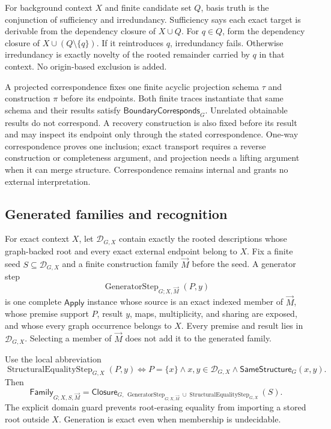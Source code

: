 \documentclass[11pt,twoside]{article}
\newcommand{\Apply}{\mathsf{Apply}}
\newcommand{\Closure}{\mathsf{Closure}}
\newcommand{\SameStructure}{\mathsf{SameStructure}}
\newcommand{\BoundaryCorresponds}{\mathsf{BoundaryCorresponds}}
\newcommand{\Family}{\mathsf{Family}}
\begin{document}
For background context \(X\) and finite candidate set \(Q\), basis truth is the
conjunction of sufficiency and irredundancy.  Sufficiency says each exact target is
derivable from the dependency closure of \(X\cup Q\).  For \(q\in Q\), form the
dependency closure of \(X\cup(Q\setminus\{q\})\).  If it reintroduces \(q\),
irredundancy fails.  Otherwise irredundancy is exactly novelty of the rooted
remainder carried by \(q\) in that context.  No origin-based exclusion is added.

A projected correspondence fixes one finite acyclic projection schema \(\tau\)
and construction \(\pi\) before its endpoints.  Both finite traces instantiate
that same schema and their results satisfy
\(\BoundaryCorresponds_G\).  Unrelated obtainable results do not correspond.
A recovery construction is also fixed before its result and may inspect its
endpoint only through the stated correspondence.  One-way correspondence proves
one inclusion; exact transport requires a reverse construction or completeness
argument, and projection needs a lifting argument when it can merge structure.
Correspondence remains internal and grants no external interpretation.

\subsection{Generated families and recognition}\label{sec:families}

For exact context \(X\), let \(\mathcal D_{G,X}\) contain exactly the rooted
descriptions whose graph-backed root and every exact external endpoint belong to
\(X\).  Fix a finite seed \(S\subseteq\mathcal D_{G,X}\) and a finite construction
family \(\vec M\) before the seed.  A generator step
\[
  \operatorname{GeneratorStep}_{G;X,\vec M}(P,y)
\]
is one complete \(\Apply\) instance whose source is an exact indexed member of
\(\vec M\), whose premise support \(P\), result \(y\), maps, multiplicity, and
sharing are exposed, and whose every graph occurrence belongs to \(X\).  Every
premise and result lies in \(\mathcal D_{G,X}\).  Selecting a member of \(\vec M\)
does not add it to the generated family.

Use the local abbreviation
\[
 \operatorname{StructuralEqualityStep}_{G,X}(P,y)
 \Longleftrightarrow
 P=\{x\}\land x,y\in\mathcal D_{G,X}
       \land\SameStructure_G(x,y).
\]
Then
\[
  \Family_{G;X,S,\vec M}
  =
  \Closure_{G,\,
    \operatorname{GeneratorStep}_{G;X,\vec M}
      \cup\operatorname{StructuralEqualityStep}_{G,X}}(S).
\]
The explicit domain guard prevents root-erasing equality from importing a stored
root outside \(X\).  Generation is exact even when membership is undecidable.
\end{document}
